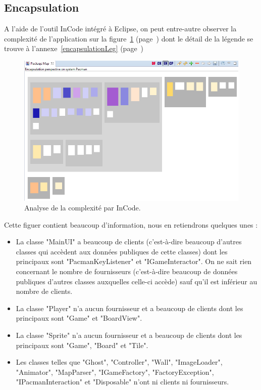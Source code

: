 \documentclass[12pt,a4paper,final]{article}
\newcommand{\annexe}[1]{annexe~\ref{#1} (page~\pageref{#1})}
\newcommand{\labelfigure}[1]{figure~\ref{#1} (page~\pageref{#1})}
\begin{document}
\subsection{Encapsulation}
A l'aide de l'outil InCode intégré à Eclipse, on peut entre-autre observer la complexité de l'application sur la \labelfigure{encapsulation} dont le détail de la légende se trouve à l'\annexe{encapsulationLeg}
\begin{figure}[!h]
	\centering
	\includegraphics[width=\textwidth]{InCodeEncapsulation.png}
	\caption{\label{encapsulation}Analyse de la complexité par InCode.}
\end{figure}
Cette figuer contient beaucoup d'information, nous en retiendrons quelques unes : 
\begin{itemize}
\item La classe "MainUI" a beaucoup de clients (c'est-à-dire beaucoup d'autres classes qui accèdent aux données publiques de cette classes) dont les principaux sont "PacmanKeyListener" et "IGameInteractor". On ne sait rien concernant le nombre de fournisseurs (c'est-à-dire beaucoup de données publiques d'autres classes auxquelles celle-ci accède) sauf qu'il est inférieur au nombre de clients.
\item La classe "Player" n'a aucun fournisseur et a beaucoup de clients dont les principaux sont "Game" et "BoardView".
\item La classe "Sprite" n'a aucun fournisseur et a beaucoup de clients dont les principaux sont "Game", "Board" et "Tile".
\item Les classes telles que "Ghost", "Controller", "Wall", "ImageLoader", "Animator", "MapParser", "IGameFactory", "FactoryException", "IPacmanInteraction" et "Disposable" n'ont ni clients ni fournisseurs.
\end{itemize}
\end{document}
